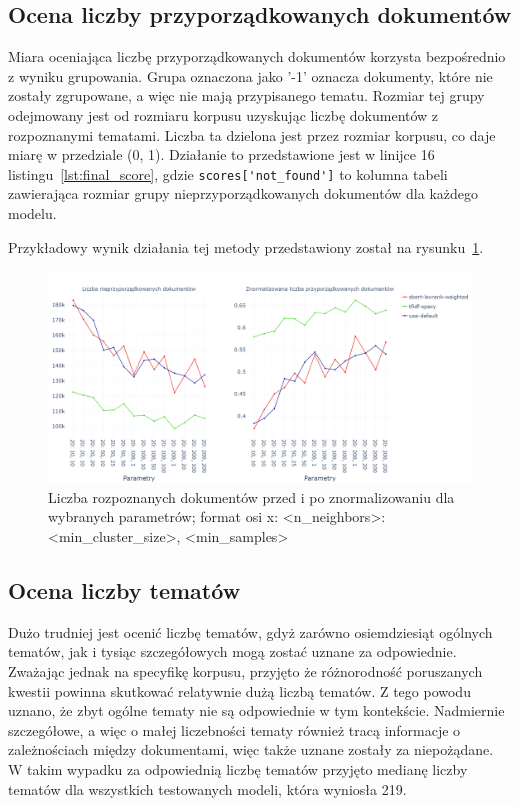 	\subsection{Ocena liczby przyporządkowanych dokumentów}\label{sec:score_not_found}
		Miara oceniająca liczbę przyporządkowanych dokumentów korzysta bezpośrednio z wyniku grupowania.
		Grupa oznaczona jako '-1' oznacza dokumenty, które nie zostały zgrupowane, a więc nie mają przypisanego tematu.
		Rozmiar tej grupy odejmowany jest od rozmiaru korpusu uzyskując liczbę dokumentów z rozpoznanymi tematami.
		Liczba ta dzielona jest przez rozmiar korpusu, co daje miarę w przedziale (0, 1).
		Działanie to przedstawione jest w linijce 16 listingu~\ref{lst:final_score},
			gdzie \verb|scores['not_found']| to kolumna tabeli zawierająca rozmiar grupy nieprzyporządkowanych dokumentów dla każdego modelu.
		
		Przykładowy wynik działania tej metody przedstawiony został na rysunku~\ref{fig:not_found}.

		\begin{figure}[htb]
			\centering
			\includegraphics[width=\linewidth]{rys05/not_found.png}
			\caption{Liczba rozpoznanych dokumentów przed i po znormalizowaniu dla wybranych parametrów; format osi x: <n\_neighbors>: <min\_cluster\_size>, <min\_samples>}\label{fig:not_found}
		\end{figure}

	\subsection{Ocena liczby tematów}
		Dużo trudniej jest ocenić liczbę tematów, gdyż zarówno osiemdziesiąt ogólnych tematów,
			jak i tysiąc szczegółowych mogą zostać uznane za odpowiednie.
		Zważając jednak na specyfikę korpusu, przyjęto że różnorodność poruszanych kwestii powinna skutkować relatywnie dużą liczbą tematów.
		Z tego powodu uznano, że zbyt ogólne tematy nie są odpowiednie w tym kontekście.
		Nadmiernie szczegółowe, a więc o małej liczebności tematy również tracą informacje o zależnościach między dokumentami,
			więc także uznane zostały za niepożądane.
		W takim wypadku za odpowiednią liczbę tematów przyjęto medianę liczby tematów dla wszystkich testowanych modeli, która wyniosła 219.

